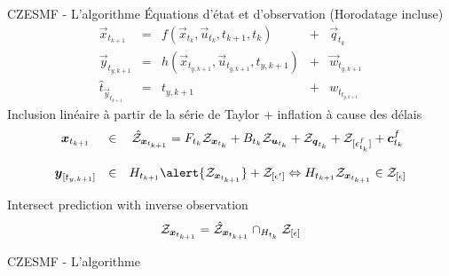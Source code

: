 \documentclass[aspectratio=169]{neocampus}
\begin{document}
\begin{frame}{CZESMF - L'algorithme \hyperlink{czesmf_presentation}{\beamerreturnbutton{}}}
\hypertarget{czesmf_algo}{}
\centering
Équations d'état et d'observation (Horodatage incluse)
\begin{equation*}
  \begin{matrix}
  \vec{x}_{t_{k+1}}&=&f(\vec{x}_{t_{k}},\vec{u}_{t_{k}},t_{k+1},t_{k})&+&\vec{q}_{t_{k}}\\
    \vec{y}_{t_{y,k+1}} &=& h(\vec{x}_{t_{y,k+1}},\vec{u}_{t_{y,k+1}},t_{y,k+1})&+&\vec{w}_{t_{y,k+1}} \\
    \hat{t}_{\vec{y}_{t_{k+1}}}&=& t_{y,k+1} &+& w_{t_{t_{y,k+1}}}
  \end{matrix}
\end{equation*}
\pause
Inclusion linéaire à partir de la série de Taylor + inflation à cause des délais
\begin{equation*}
  \begin{matrix}
  \vec{x}_{t_{k+1}}&\in&\hat{\set{Z}}_{\vec{x}_{t_{k+1}}}=F_{t_{k}}\set{Z}_{\vec{x}_{t_{k}}}+B_{t_{k}}\set{Z}_{\vec{u}_{t_{k}}}+\set{Z}_{\vec{q}_{t_{k}}}+\set{Z}_{[\epsilon^{f}_{t_{k}}]}+\vec{c}^{f}_{t_{k}}\\
    \\
    \vec{y}_{[t_{y,k+1}]}&\in&H_{t_{k+1}}\alert{\set{Z}_{\vec{x}_{t_{k+1}}}}+\set{Z}_{[\epsilon']}\iff H_{t_{k+1}}\set{Z}_{\vec{x}_{t_{k+1}}}\in\set{Z}_{[\epsilon]}\\
  \end{matrix}
\end{equation*}

\pause
Intersect prediction with inverse observation
\begin{equation*}
\mathcal{Z}_{\boldsymbol{x}_{t_{k+1}}}=\hat{\mathcal{Z}}_{\boldsymbol{x}_{t_{k+1}}}\cap_{H_{t_{k}}}\mathcal{Z}_{[\epsilon]}
\end{equation*}

\end{frame}

\begin{frame}{CZESMF - L'algorithme \hyperlink{czesmf_presentation}{\beamerreturnbutton{}}}
  \centering
\end{frame}
\end{document}
